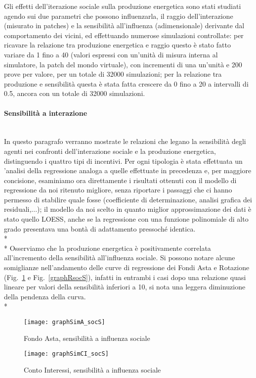 \documentclass[12pt,a4paper,openright,twoside]{report}
\newcommand{\myparagraph}[1]{\paragraph{#1}\mbox{}\\}
\begin{document}
Gli effetti dell'iterazione sociale sulla produzione energetica sono stati studiati agendo sui due parametri che possono influenzarla, il raggio dell'interazione (misurato in patches) e la sensibilità all'influenza (adimensionale) derivante dal comportamento dei vicini, ed effettuando numerose simulazioni controllate: per ricavare la relazione tra produzione energetica e raggio questo è stato fatto variare da 1 fino a 40 (valori espressi con un'unità di misura interna al simulatore, la patch del mondo virtuale), con incrementi di una un'unità e 200 prove per valore, per un totale di 32000 simulazioni; per la relazione tra produzione e sensibilità questa è stata fatta crescere da 0 fino a 20 a intervalli di 0.5, ancora con un totale di 32000 simulazioni.

\myparagraph{Sensibilità a interazione}

In questo paragrafo verranno mostrate le relazioni che legano la sensibilità degli agenti nei confronti dell'interazione sociale e la produzione energetica, distinguendo i quattro tipi di incentivi. Per ogni tipologia è stata effettuata un 'analisi della regressione analoga a quelle effettuate in precedenza e, per maggiore concisione, esaminiamo ora direttamente i risultati ottenuti con il modello di regressione da noi ritenuto migliore, senza riportare i passaggi che ci hanno permesso di stabilire quale fosse (coefficiente di determinazione, analisi grafica dei residuali,...); il modello da noi scelto in quanto miglior approssimazione dei dati è stato quello LOESS, anche se la regressione con una funzione polinomiale di alto grado presentava una bontà di adattamento pressoché identica.\\* \\*
Osserviamo che  la produzione energetica è positivamente correlata all'incremento della sensibilità all'influenza sociale. Si possono notare alcune somiglianze nell'andamento delle curve di regressione dei Fondi Asta e Rotazione (Fig.~\ref{graphAsocS} e Fig.~\ref{graphRsocS}), infatti in entrambi i casi dopo una relazione quasi lineare per valori della sensibilità inferiori a 10, si nota una leggera diminuzione della pendenza della curva. \\*

\begin{figure}[H]
	\centering
	\texttt{[image: graphSimA\_socS]}
	\caption{Fondo Asta, sensibilità a influenza sociale}
	\label{graphAsocS}
\end{figure}

\begin{figure}[hbt]
	\centering
	\texttt{[image: graphSimCI\_socS]}
	\caption{Conto Interessi, sensibilità a influenza sociale}
	\label{graphCIsocS}
\end{figure}
\end{document}
